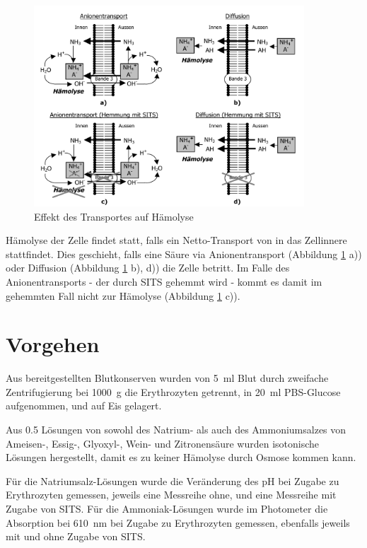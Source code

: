 \documentclass[a4paper,german]{scrreprt}
\begin{document}
\begin{figure}[h]
	\centering
	\includegraphics[width=0.9\textwidth]{img/th_transport_haem}
	\caption{Effekt des Transportes auf Hämolyse}
	\label{fig:transport_haem}
\end{figure}

Hämolyse der Zelle findet statt, falls ein Netto-Transport von  in das
Zellinnere stattfindet. Dies geschieht, falls eine Säure via Anionentransport
(Abbildung \ref{fig:transport_haem} a)) oder Diffusion (Abbildung
\ref{fig:transport_haem} b), d)) die Zelle betritt. Im Falle des
Anionentransports - der durch SITS gehemmt wird - kommt es damit im gehemmten
Fall nicht zur Hämolyse (Abbildung \ref{fig:transport_haem} c)).

\section{Vorgehen}

Aus bereitgestellten Blutkonserven wurden von \SI{5}{ml} Blut durch zweifache
Zentrifugierung bei \SI{1000}{g} die Erythrozyten getrennt, in \SI{20}{ml} PBS-Glucose
aufgenommen, und auf Eis gelagert.

Aus \SI{0.5}{\Molar} Lösungen von sowohl des Natrium- als auch des
Ammoniumsalzes von Ameisen-, Essig-, Glyoxyl-, Wein- und Zitronensäure wurden
isotonische Lösungen hergestellt, damit es zu keiner Hämolyse durch Osmose
kommen kann.

Für die Natriumsalz-Lösungen wurde die Veränderung des pH bei Zugabe zu
Erythrozyten gemessen, jeweils eine Messreihe ohne, und eine Messreihe mit
Zugabe von SITS. Für die Ammoniak-Lösungen wurde im Photometer die Absorption
bei \SI{610}{nm} bei Zugabe zu Erythrozyten gemessen, ebenfalls jeweils mit und
ohne Zugabe von SITS.
\end{document}
